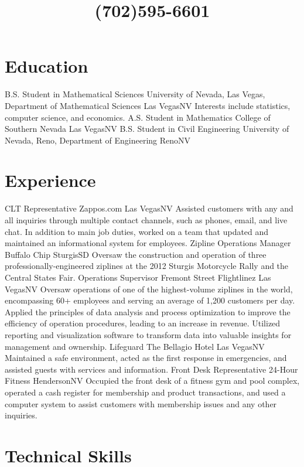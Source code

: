 \documentclass[11pt]{moderncv}
\title{(702)595-6601}
\begin{document}
	\maketitle
	\section{Education}
				{B.S. Student in Mathematical Sciences}
				{University of Nevada, Las Vegas, Department of Mathematical Sciences}
				{Las Vegas}{NV}
				{Interests include statistics, computer science, and economics.}  
				{A.S. Student in Mathematics}
				{College of Southern Nevada}
				{Las Vegas}{NV}
				{}
				{B.S. Student in Civil Engineering}
				{University of Nevada, Reno, Department of Engineering}
				{Reno}{NV}
				{}
	\section{Experience}
				{CLT Representative}
				{Zappos.com}
				{Las Vegas}{NV}
				{Assisted customers with any and all inquiries through multiple contact channels, such as phones, email, and live chat.  In addition to main job duties, worked on a team that updated and maintained an informational system for employees.}
				{Zipline Operations Manager}
				{Buffalo Chip}
				{Sturgis}{SD}
				{Oversaw the construction and operation of three professionally-engineered ziplines at the 2012 Sturgis Motorcycle Rally and the Central States Fair.}
				{Operations Supervisor}
				{Fremont Street Flightlinez}
				{Las Vegas}{NV}
				{Oversaw operations of one of the highest-volume ziplines in the world, encompassing 60+ employees and serving an average of 1,200 customers per day.  Applied the principles of data analysis and process optimization to improve the efficiency of operation procedures, leading to an increase in revenue.  Utilized reporting and visualization software to transform data into valuable insights for management and ownership.}
				{Lifeguard}
				{The Bellagio Hotel}
				{Las Vegas}{NV}
				{Maintained a safe environment, acted as the first response in emergencies, and assisted guests with services and information.}
				{Front Desk Representative}
				{24-Hour Fitness}
				{Henderson}{NV}
				{Occupied the front desk of a fitness gym and pool complex, operated a cash register for membership and product transactions, and used a computer system to assist customers with membership issues and any other inquiries.}

	\section{Technical Skills}
\end{document}
